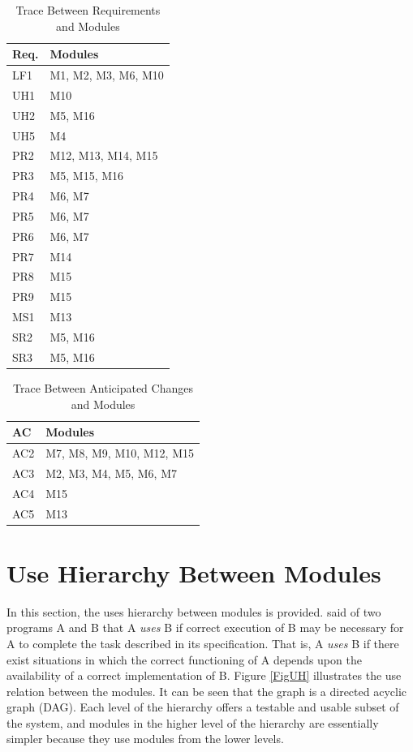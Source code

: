 \documentclass[12pt, titlepage]{article}
\begin{document}
\begin{table}[H]
	\centering
	\begin{tabular}{p{} p{}}
		\toprule
		\textbf{Req.} & \textbf{Modules}\\
		\midrule
		LF1 & M1, M2, M3, M6, M10\\
		UH1 & M10\\
		UH2 & M5, M16\\
		UH5 & M4\\
		PR2 & M12, M13, M14, M15\\
		PR3 & M5, M15, M16\\
		PR4 & M6, M7\\
		PR5 & M6, M7\\
		PR6 & M6, M7\\
		PR7 & M14\\
		PR8 & M15\\
		PR9 & M15\\
		MS1 & M13\\
		SR2 & M5, M16\\
		SR3 & M5, M16\\
		
		
		\bottomrule
	\end{tabular}
\caption{Trace Between Requirements and Modules}
\label{TblRT}
\end{table}
\begin{table}[H]
\centering
\begin{tabular}{p{} p{}}
\toprule
\textbf{AC} & \textbf{Modules}\\
\midrule
AC2 &  M7, M8, M9, M10, M12, M15\\
AC3 & M2, M3, M4, M5, M6, M7\\
AC4 & M15\\
AC5 & M13\\
\bottomrule
\end{tabular}
\caption{Trace Between Anticipated Changes and Modules}
\label{TblACT}
\end{table}

\section{Use Hierarchy Between Modules} \label{SecUse}

In this section, the uses hierarchy between modules is
provided. \citet{Parnas1978} said of two programs A and B that A {\em uses} B if
correct execution of B may be necessary for A to complete the task described in
its specification. That is, A {\em uses} B if there exist situations in which
the correct functioning of A depends upon the availability of a correct
implementation of B.  Figure \ref{FigUH} illustrates the use relation between
the modules. It can be seen that the graph is a directed acyclic graph
(DAG). Each level of the hierarchy offers a testable and usable subset of the
system, and modules in the higher level of the hierarchy are essentially simpler
because they use modules from the lower levels.
\end{document}
